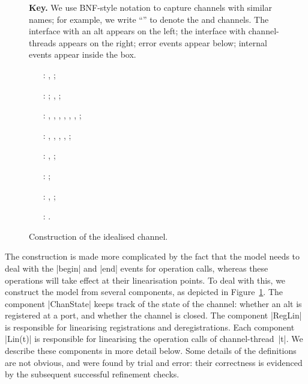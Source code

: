\begin{figure}

\uncspMid
\textbf{Key.}  We use BNF-style notation to capture
channels with similar names; for example, we write
``\m{}'' to denote the  and
 channels.  The interface with an alt appears on the left; the
interface with channel-threads appears on the right; error events appear
below; internal events appear inside the box. 

\raggedright
%
\begin{itemize}
\item[\inCircle{1}:]  \m{}\m{}, 
  \m{}\m{};

\item[\inCircle{2}:] \m{};
  \m{}, ;

\item[\inCircle{3}:] , ,
  , , , ,
  ;

\item[\inCircle{4}:] \m{},
  \m{}, \m{},
  \m{}, \m{};

\item[\inCircle{5}:] \m{},
  \m{};

\item[\inCircle{6}:] \m{};

\item[\inCircle{7}:] ,
  \m{};

\item[\inCircle{8}:] \m{}.
\end{itemize}
\caption{Construction of the idealised channel.  \label{fig:idealised-chan}}
\end{figure}

\cspMid


The construction is made more complicated by the fact that the model needs to
deal with the |begin| and |end| events for operation calls, whereas these
operations will take effect at their linearisation points.  To deal with this,
we construct the model from several components, as depicted in
Figure~\ref{fig:idealised-chan}.  The component |ChanState| keeps track of the
state of the channel: whether an alt is registered at a port, and whether the
channel is closed.  The component |RegLin| is responsible for linearising
registrations and deregistrations.  Each component |Lin(t)| is responsible for
linearising the operation calls of channel-thread~|t|.  We describe these
components in more detail below.  Some details of the definitions are not
obvious, and were found by trial and error: their correctness is evidenced by
the subsequent successful refinement checks.

